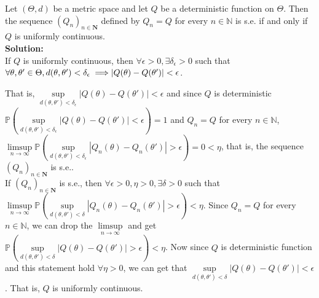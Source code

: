 \documentclass[11pt,letterpaper]{article}                  %
\begin{document}
\bigskip
\begin{problem} Let $(\Theta, d)$ be a metric space and let $Q$ be a deterministic function on $\Theta$. Then the sequence $(Q_n)_{n \in \mathbf{N}}$ defined by $Q_n = Q$ for every $n \in \mathbb{N}$ is s.e. if and only if $Q$ is uniformly continuous.\\
	
	\textbf{Solution:} \\
	
	If $Q$ is uniformly continuous, then $\forall \epsilon > 0, \exists \delta_\epsilon > 0$ such that $\forall \theta, \theta' \in \Theta, d(\theta, \theta') < \delta_\epsilon \implies \\ |Q(\theta) - Q(\theta')| < \epsilon$.
	
	That is, $\sup\limits_{d(\theta, \theta') < \delta_\epsilon} |Q(\theta) - Q(\theta')| < \epsilon$ and since $Q$ is deterministic $\mathbb{P} (\sup\limits_{d(\theta, \theta') < \delta_\epsilon} |Q(\theta) - Q(\theta')| < \epsilon) = 1$ and $Q_n = Q$ for every $n \in \mathbb{N}$,  $ \limsup\limits_{n \rightarrow \infty} \mathbb{P} (\sup\limits_{d(\theta, \theta') < \delta_\epsilon} |Q_n(\theta) - Q_n(\theta')| > \epsilon) = 0 < \eta$, that is, the sequence $(Q_n)_{n \in \mathbf{N}}$ is s.e..  \\
	
	If  $(Q_n)_{n \in \mathbf{N}}$ is s.e., then    $ \forall \epsilon > 0, \eta > 0, \exists \delta > 0$ such that $\limsup\limits_{n \rightarrow \infty} \mathbb{P} (\sup\limits_{d(\theta, \theta') < \delta} |Q_n(\theta) - Q_n(\theta')| > \epsilon) < \eta$. Since  $Q_n = Q$ for every $n \in \mathbb{N}$, we can drop the $\limsup\limits_{n \rightarrow \infty}$ and get \\ $\mathbb{P} (\sup\limits_{d(\theta, \theta') < \delta} |Q(\theta) - Q(\theta')| > \epsilon) < \eta$. Now since $Q$ is deterministic function and this statement hold $\forall \eta > 0$, we can get that $\sup\limits_{d(\theta, \theta') < \delta} |Q(\theta) - Q(\theta')| < \epsilon$. That is, $Q$ is uniformly continuous.  
\end{problem}
\end{document}
